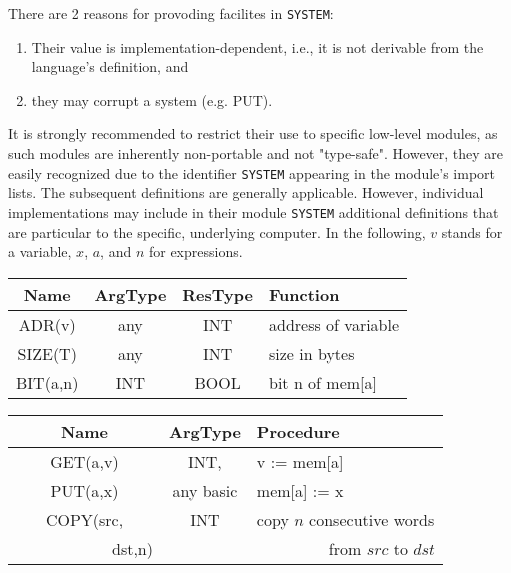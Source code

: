 There are 2 reasons for provoding facilites in \verb|SYSTEM|:
\begin{enumerate}
  \item Their value is implementation-dependent, i.e., it is not derivable from the language's
    definition, and
  \item they may corrupt a system (e.g. PUT).
\end{enumerate}
It is strongly recommended to restrict their use to specific low-level modules, as such
modules are inherently non-portable and not "type-safe". However, they are easily recognized
due to the identifier \verb|SYSTEM| appearing in the module's import lists. The subsequent
definitions are generally applicable. However, individual implementations may include in
their module \verb|SYSTEM| additional definitions that are particular to the specific,
underlying computer. In the following, $v$ stands for a variable, $x$, $a$, and $n$ for expressions.
\begin{table}[h!]
  \centering
  \begin{tabular}{c c c l}
    Name     & ArgType & ResType & Function \\\hline
    ADR(v)   & any     & INT & address of variable \\
    SIZE(T)  & any     & INT & size in bytes \\
    BIT(a,n) & INT & BOOL & bit n of mem[a]
  \end{tabular}
\end{table}
\begin{table}[h!]
  \centering
  \begin{tabular}{c c l}
    Name     & ArgType & Procedure \\\hline
    GET(a,v) & INT,& v := mem[a] \\
    PUT(a,x) &any basic& mem[a] := x \\\hline
    COPY(src,& INT & copy $n$ consecutive words\\
    ~~~~~~~~~~~~dst,n)&& ~~~~~~~~~from $src$ to $dst$
  \end{tabular}
\end{table}

